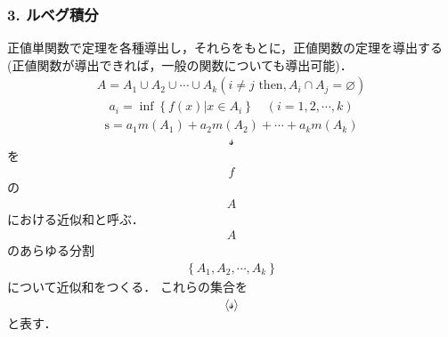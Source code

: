 \documentclass[letterpaper,10pt,english]{sphinxmanual}
\begin{document}
\subsubsection{3. ルベグ積分}
\label{\detokenize{src/stochasticcalculus/2020-03-16-lebesgue:id11}}
\sphinxAtStartPar
正値単関数で定理を各種導出し，それらをもとに，正値関数の定理を導出する(正値関数が導出できれば，一般の関数についても導出可能)．
\begin{equation*}
\begin{split}\begin{equation}
A=A_{1} \cup A_{2} \cup \cdots \cup A_{k} (i \neq j \text{ then}, A_{i} \cap A_{j}=\varnothing )
\end{equation}\end{split}
\end{equation*}\begin{equation*}
\begin{split}\begin{equation}
a_{i}=\inf \left\{f(x) | x \in A_{i}\right\} \quad(i=1,2, \cdots, k)
\end{equation}\end{split}
\end{equation*}\begin{equation*}
\begin{split}\begin{equation}
\mathrm{s}=a_{1} m\left(A_{1}\right)+a_{2} m\left(A_{2}\right)+\cdots+a_{k} m\left(A_{k}\right)
\end{equation}\end{split}
\end{equation*}\begin{equation*}
\begin{split}\mathcal{s}\end{split}
\end{equation*}
\sphinxAtStartPar
を
\begin{equation*}
\begin{split}f\end{split}
\end{equation*}
\sphinxAtStartPar
の
\begin{equation*}
\begin{split}A\end{split}
\end{equation*}
\sphinxAtStartPar
における近似和と呼ぶ．
\begin{equation*}
\begin{split}A\end{split}
\end{equation*}
\sphinxAtStartPar
のあらゆる分割
\begin{equation*}
\begin{split}\left\{A_{1}, A_{2}, \cdots, A_{k}\right\}\end{split}
\end{equation*}
\sphinxAtStartPar
について近似和をつくる． これらの集合を
\begin{equation*}
\begin{split}\langle \mathcal{s} \rangle\end{split}
\end{equation*}
\sphinxAtStartPar
と表す．
\end{document}
